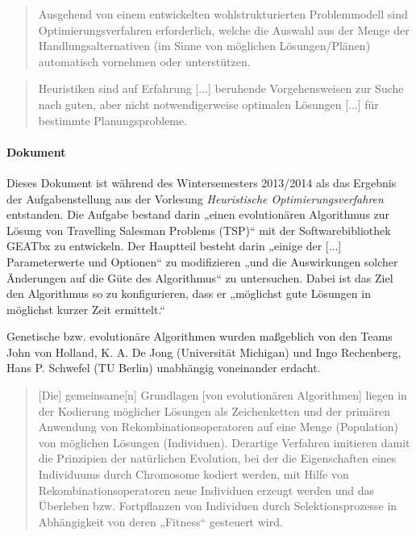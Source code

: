 \begin{quote}
Ausgehend von einem entwickelten wohlstrukturierten Problemmodell sind 
Optimierungsverfahren erforderlich, welche die Auswahl aus der Menge der 
Handlungsalternativen (im Sinne von möglichen Lösungen/Plänen) automatisch
vornehmen oder unterstützen. \citep[S.~3]{fink}
\end{quote}

\begin{quote}
Heuristiken sind auf Erfahrung [...] beruhende Vorgehensweisen zur
Suche nach guten, aber nicht notwendigerweise optimalen Lösungen
[...] für bestimmte Planungsprobleme. \citep[S.~4]{fink}
\end{quote}

\paragraph{Dokument} Dieses Dokument
ist während des Wintersemesters 2013/2014 als das
Ergebnis der Aufgabenstellung aus der Vorlesung
\emph{Heuristische Optimierungsverfahren} entstanden.
Die Aufgabe bestand darin „einen evolutionären Algorithmus zur Lösung von
Travelling Salesman Problems (TSP)“ mit der Softwarebibliothek GEATbx zu entwickeln.
Der Hauptteil besteht darin „einige der [...] Parameterwerte und Optionen“ zu
modifizieren „und die Auswirkungen solcher Änderungen auf die Güte des Algorithmus“
zu untersuchen.
Dabei ist das Ziel den Algorithmus so zu konfigurieren, dass er
„möglichst gute Lösungen in möglichst kurzer Zeit ermittelt.“ \citep[Aus][]{aufg}

Genetische bzw. evolutionäre Algorithmen wurden maßgeblich von den Teams
John von Holland, K. A. De Jong (Universität Michigan) und
Ingo Rechenberg, Hans P. Schwefel (TU Berlin) unabhängig voneinander erdacht.
\citep[Vgl.][]{erben}

\begin{quote}
[Die] gemeinsame[n] Grundlagen [von evolutionären Algorithmen] liegen in der
Kodierung möglicher Lösungen als Zeichenketten und der primären Anwendung von
Rekombinationsoperatoren auf eine Menge (Population) von möglichen Lösungen
(Individuen). Derartige Verfahren imitieren damit die Prinzipien der
natürlichen Evolution, bei der die Eigenschaften eines Individuums durch
Chromosome kodiert werden, mit Hilfe von Rekombinationsoperatoren neue
Individuen erzeugt werden und das Überleben bzw. Fortpflanzen von Individuen
durch Selektionsprozesse in Abhängigkeit von deren
„Fitness“ gesteuert wird. \citep[S.~6]{fink}
\end{quote}

